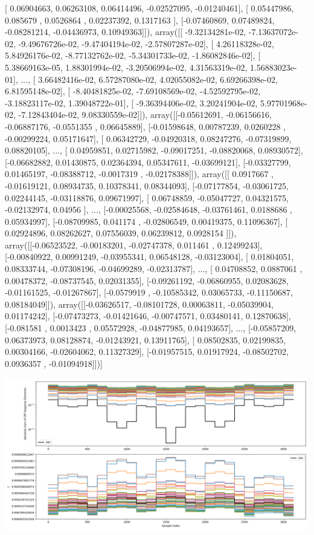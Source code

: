 \documentclass{article}
\begin{document}
       [ 0.06904663,  0.06263108,  0.06414496, -0.02527095, -0.01240461],
       [ 0.05447986,  0.085679  ,  0.0526864 ,  0.02237392,  0.1317163 ],
       [-0.07460869,  0.07489824, -0.08281214, -0.04436973,  0.10949363]]), array([[ -9.32134281e-02,  -7.13637072e-02,  -9.49676726e-02,
         -9.47404194e-02,  -2.57807287e-02],
       [  4.26118328e-02,   5.84926176e-02,  -8.77132762e-02,
         -5.34301733e-02,  -1.86082846e-02],
       [  5.38669163e-05,   1.88301994e-02,  -3.20506994e-02,
          4.31563319e-02,   1.56883023e-01],
       ..., 
       [  3.66482416e-02,   6.57287080e-02,   4.02055082e-02,
          6.69266398e-02,   6.81595148e-02],
       [ -8.40481825e-02,  -7.69108569e-02,  -4.52592795e-02,
         -3.18823117e-02,   1.39048722e-01],
       [ -9.36394406e-02,   3.20241904e-02,   5.97701968e-02,
         -7.12843404e-02,   9.08330559e-02]]), array([[-0.05612691, -0.06156616, -0.06887176, -0.0551355 ,  0.06645889],
       [-0.01598648,  0.00787239,  0.0260228 , -0.00299224,  0.05171647],
       [ 0.06342729, -0.04920318,  0.08247276, -0.07319899,  0.08820105],
       ..., 
       [ 0.04959851,  0.02715982, -0.09017251, -0.08820068,  0.08930572],
       [-0.06682882,  0.01430875,  0.02364394,  0.05347611, -0.03699121],
       [-0.03327799,  0.01465197, -0.08388712, -0.0017319 , -0.02178388]]), array([[ 0.0917667 , -0.01619121,  0.08934735,  0.10378341,  0.08344093],
       [-0.07177854, -0.03061725,  0.02244145, -0.03118876,  0.09671997],
       [ 0.06748859, -0.05047727,  0.04321575, -0.02132974,  0.04956   ],
       ..., 
       [-0.00025568, -0.02584648, -0.03761461,  0.0188686 ,  0.05934997],
       [-0.08709985,  0.041174  , -0.02806549,  0.00419375,  0.11096367],
       [ 0.02924896,  0.08262627,  0.07556039,  0.06239812,  0.0928154 ]]), array([[-0.06523522, -0.00183201, -0.02747378,  0.011461  ,  0.12499243],
       [-0.00840922,  0.00991249, -0.03955341,  0.06548128, -0.03123004],
       [ 0.01804051,  0.08333744, -0.07308196, -0.04699289, -0.02313787],
       ..., 
       [ 0.04708852,  0.0887061 ,  0.00478372, -0.08737545,  0.02031355],
       [-0.09261192, -0.06860955,  0.02083628, -0.01161525, -0.01267867],
       [-0.0579919 , -0.10585342,  0.03065733, -0.11150687,  0.08184049]]), array([[-0.03626517, -0.08101728,  0.00063811, -0.05039904,  0.01174242],
       [-0.07473273, -0.01421646, -0.00747571,  0.03480141,  0.12870638],
       [-0.081581  ,  0.0013423 ,  0.05572928, -0.04877985,  0.04193657],
       ..., 
       [-0.05857209,  0.06373973,  0.08128874, -0.01243921,  0.13911765],
       [ 0.08502835,  0.02199835,  0.00304166, -0.02604062,  0.11327329],
       [-0.01957515,  0.01917924, -0.08502702,  0.0936357 , -0.01094918]])]
\begin{center}
\includegraphics[scale=.9]{report_pickled_controls259/control_dpn_all.png}

\end{center}
\end{document}
